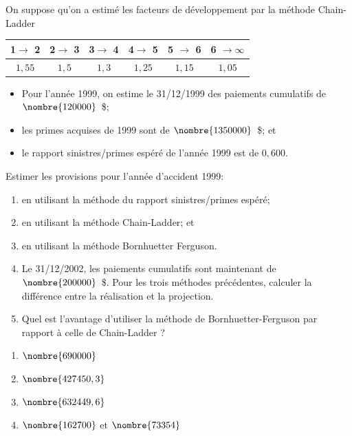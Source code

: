 \begin{exercice}
  On suppose qu'on a estimé les facteurs de développement par la
  méthode Chain-Ladder
  \begin{center}
    \begin{tabular}{|c c c c c c|}\hline
      1$\rightarrow$ 2 &  2$\rightarrow$ 3 &  3$\rightarrow$ 4 &  4$\rightarrow$ 5  &5 $\rightarrow$ 6 &6 $\rightarrow  \infty$ \\ \hline
      $1,55$ & $1,5$ & $1,3$ & $1,25$ & $1,15$ & $1,05$ \\ \hline
    \end{tabular}
  \end{center}
  \begin{itemize}
  \item Pour l'année 1999, on estime le 31/12/1999 des paiements
    cumulatifs de $\nombre{120000}$~\$;
  \item les primes acquises de 1999 sont de $\nombre{1350000}$~\$; et
  \item le rapport sinistres/primes espéré de l'année 1999 est de
    $0,600$.
  \end{itemize}
  Estimer les provisions pour l'année d'accident 1999:
  \begin{enumerate}
  \item en utilisant la méthode du rapport sinistres/primes espéré;
  \item en utilisant la méthode Chain-Ladder; et
  \item en utilisant la méthode Bornhuetter Ferguson.
  \item Le 31/12/2002, les paiements cumulatifs sont maintenant de
    $\nombre{200000}$~\$. Pour les trois méthodes précédentes,
    calculer la différence entre la réalisation et la projection.
  \item Quel est l'avantage d'utiliser la méthode de
    Bornhuetter-Ferguson par rapport à celle de Chain-Ladder ?
  \end{enumerate}
  \begin{rep}
    \begin{enumerate}
    \item $\nombre{690000}$
    \item $\nombre{427450,3}$
    \item $\nombre{632449,6}$
    \item $\nombre{162700}$ et $\nombre{73354}$
    \end{enumerate}
  \end{rep}
  \begin{sol}

\end{sol}
\end{exercice}
